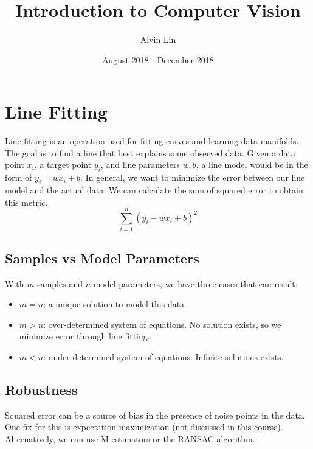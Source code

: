 \documentclass{math}
\title{Introduction to Computer Vision}
\author{Alvin Lin}
\date{August 2018 - December 2018}
\begin{document}
\maketitle

\section*{Line Fitting}
Line fitting is an operation used for fitting curves and learning data
manifolds. The goal is to find a line that best explains some observed data.
Given a data point \( x_i \), a target point \( y_i \), and line parameters
\( w,b \), a line model would be in the form of \( y_i = wx_i+b \). In general,
we want to minimize the error between our line model and the actual data. We
can calculate the sum of squared error to obtain this metric.
\[ \sum_{i=1}^{n}(y_i-wx_i+b)^2 \]

\subsection*{Samples vs Model Parameters}
With \( m \) samples and \( n \) model parameters, we have three cases that
can result:
\begin{itemize}
  \item \( m = n \): a unique solution to model this data.
  \item \( m > n \): over-determined system of equations. No solution exists, so
    we minimize error through line fitting.
  \item \( m < n \): under-determined system of equations. Infinite solutions
    exists.
\end{itemize}

\subsection*{Robustness}
Squared error can be a source of bias in the presence of noise points in the
data. One fix for this is expectation maximization (not discussed in this
course). Alternatively, we can use M-estimators or the RANSAC algorithm.
\end{document}
